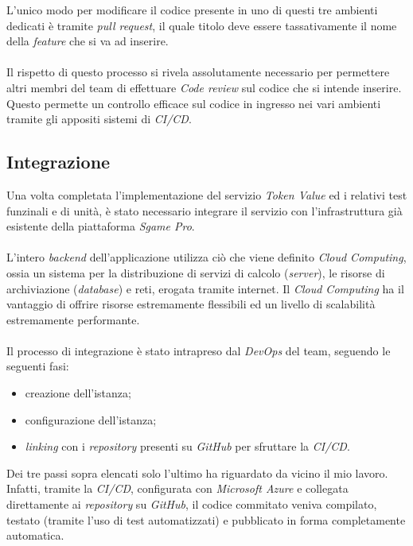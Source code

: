 \documentclass[11pt]{thesistemp}
\begin{document}
L'unico modo per modificare il codice presente in uno di questi tre ambienti dedicati è tramite \textit{pull request}, il quale titolo deve essere tassativamente il nome della \textit{feature} che si va ad inserire.\\\\
Il rispetto di questo processo si rivela assolutamente necessario per permettere altri membri del team di effettuare \textit{Code review} sul codice che si intende inserire.\\
Questo permette un controllo efficace sul codice in ingresso nei vari ambienti tramite gli appositi sistemi di \textit{CI/CD}.

\pagebreak
\subsection{Integrazione}
Una volta completata l'implementazione del servizio \textit{Token Value} ed i relativi test funzinali e di unità, è stato necessario integrare il servizio con l'infrastruttura già esistente della piattaforma \textit{Sgame Pro}.\\\\
L'intero \textit{backend} dell'applicazione utilizza ciò che viene definito \textit{Cloud Computing}, ossia un sistema per la distribuzione di servizi di calcolo (\textit{server}), le risorse di archiviazione (\textit{database}) e reti, erogata tramite internet.
Il \textit{Cloud Computing} ha il vantaggio di offrire risorse estremamente flessibili ed un livello di scalabilità estremamente performante.\\\\
Il processo di integrazione è stato intrapreso dal \textit{DevOps} del team, seguendo le seguenti fasi:
\begin{itemize}
	\item creazione dell'istanza;
	\item configurazione dell'istanza;
	\item \textit{linking} con i \textit{repository} presenti su \textit{GitHub} per sfruttare la \textit{CI/CD}.
\end{itemize}
Dei tre passi sopra elencati solo l'ultimo ha riguardato da vicino il mio lavoro.\\
Infatti, tramite la \textit{CI/CD}, configurata con \textit{Microsoft Azure} e collegata direttamente ai \textit{repository} su \textit{GitHub}, il codice commitato veniva compilato, testato (tramite l'uso di test automatizzati) e pubblicato in forma completamente automatica.\\
\end{document}
